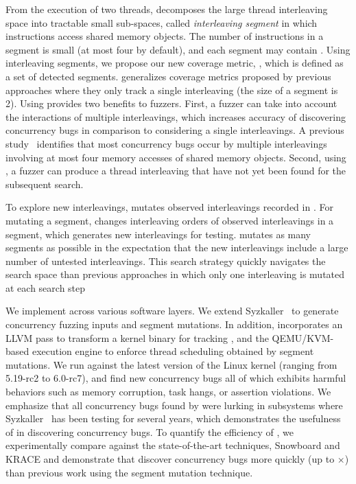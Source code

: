  From the execution of two threads,  
\sys decomposes the large thread interleaving space into tractable 
small sub-spaces, called \textit{interleaving segment} in which
instructions access shared memory objects. The number of instructions 
in a segment is small (at most four by default), and each segment may 
contain . Using interleaving segments, we propose 
our new coverage metric, \textit{\intcov}, which is defined as a set of detected segments.
%
\Intcov generalizes coverage 
metrics proposed by previous approaches where they only track 
a single interleaving (the size of a segment is 2). 
Using \intcov provides two benefits to fuzzers. First, a fuzzer can 
take into account the interactions of multiple interleavings, which increases
accuracy of discovering concurrency bugs in comparison to considering a single 
interleavings. A previous study~\cite{learningfrommistakes} identifies that
most concurrency bugs occur by multiple interleavings involving 
at most four memory accesses of shared memory objects.
Second, using \intcov, a fuzzer can produce a thread interleaving
that have not yet been found for the subsequent search.

%
To explore new interleavings,
\sys mutates observed interleavings recorded in \intcov. For mutating a segment, \sys changes interleaving orders of observed interleavings 
in a segment, which generates new interleavings for testing. \sys 
mutates as many segments as possible in the expectation that the 
new interleavings include a large number of untested interleavings. 
This search strategy quickly navigates the search space than previous 
approaches in which only one interleaving is mutated at each search step

We implement \sys across various software layers.
We extend Syzkaller~\cite{syzkaller} to generate concurrency fuzzing inputs 
and segment mutations. 
%
In addition, \sys incorporates an LLVM pass to transform a kernel
binary for tracking \intcov, and the QEMU/KVM-based execution engine
to enforce thread scheduling obtained by segment mutations. 
%
We run \sys against the latest version of the Linux kernel (ranging
from 5.19-rc2 to 6.0-rc7), and find new \totalbugs concurrency bugs all of
which exhibits harmful behaviors such as memory corruption,
task hangs, or assertion violations. We emphasize that all
concurrency bugs found by \sys were lurking in subsystems where
Syzkaller~\cite{syzkaller} has been testing for several years, which
demonstrates the usefulness of \sys in discovering concurrency bugs.
%
To quantify the efficiency of \sys, we experimentally compare \sys 
against the state-of-the-art techniques, Snowboard and KRACE and 
demonstrate that \sys discover concurrency bugs more quickly 
(up to $\times$) than previous work using the segment mutation 
technique.

